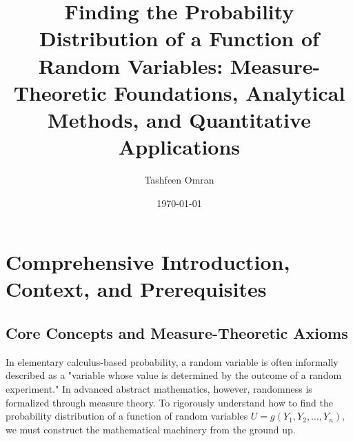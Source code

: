 \documentclass[11pt, letterpaper]{article}
\title{\textbf{Finding the Probability Distribution of a Function of Random Variables: Measure-Theoretic Foundations, Analytical Methods, and Quantitative Applications}}
\author{Tashfeen Omran}
\date{\today}
\theoremstyle{definition}
\theoremstyle{remark}
\begin{document}
\maketitle
\tableofcontents
\newpage

\section{Comprehensive Introduction, Context, and Prerequisites}

\subsection{Core Concepts and Measure-Theoretic Axioms}

In elementary calculus-based probability, a random variable is often informally described as a "variable whose value is determined by the outcome of a random experiment." In advanced abstract mathematics, however, randomness is formalized through measure theory. To rigorously understand how to find the probability distribution of a function of random variables $U = g(Y_1, Y_2, \dots, Y_n)$, we must construct the mathematical machinery from the ground up.
\end{document}
